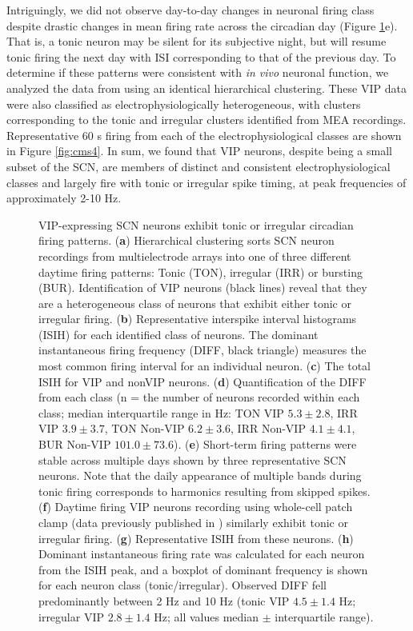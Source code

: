 Intriguingly, we did not observe day-to-day changes in neuronal firing class despite drastic changes in mean firing rate across the circadian day (Figure \ref{fig:cm2}e).
That is, a tonic neuron may be silent for its subjective night, but will resume tonic firing the next day with ISI corresponding to that of the previous day.
To determine if these patterns were consistent with \textit{in vivo} neuronal function, we analyzed the data from \cite{Hermanstyne2016} using an identical hierarchical clustering.
These VIP data were also classified as electrophysiologically heterogeneous, with clusters corresponding to the tonic and irregular clusters identified from MEA recordings.
Representative 60 s firing from each of the electrophysiological classes are shown in Figure \ref{fig:cms4}.
In sum, we found that VIP neurons, despite being a small subset of the SCN, are members of distinct and consistent electrophysiological classes and largely fire with tonic or irregular spike timing, at peak frequencies of approximately 2-10 Hz.
\clearpage
\begin{figure}[!p]
    \caption{\label{fig:cm2} 
    VIP-expressing SCN neurons exhibit tonic or irregular circadian firing patterns.
    (\textbf{a}) Hierarchical clustering sorts SCN neuron recordings from multielectrode arrays into one of three different daytime firing patterns: Tonic (TON), irregular (IRR) or bursting (BUR). Identification of VIP neurons (black lines) reveal that they are a heterogeneous class of neurons that exhibit either tonic or irregular firing. 
    (\textbf{b})  Representative interspike interval histograms (ISIH) for each identified class of neurons. The dominant instantaneous firing frequency (DIFF, black triangle) measures the most common firing interval for an individual neuron. 
    (\textbf{c}) The total ISIH for VIP and nonVIP neurons. 
    (\textbf{d}) Quantification of the DIFF from each class (n = the number of neurons recorded within each class; median interquartile range in Hz: TON VIP $5.3 \pm 2.8$, IRR VIP $3.9 \pm 3.7$, TON Non-VIP $6.2 \pm 3.6$, IRR Non-VIP $4.1 \pm 4.1$, BUR Non-VIP $101.0 \pm 73.6$). 
    (\textbf{e}) Short-term firing patterns were stable across multiple days shown by three representative SCN neurons. Note that the daily appearance of multiple bands during tonic firing corresponds to harmonics resulting from skipped spikes. 
    (\textbf{f}) Daytime firing VIP neurons recording using whole-cell patch clamp (data previously published in \cite{Hermanstyne2016}) similarly exhibit tonic or irregular firing. 
    (\textbf{g}) Representative ISIH from these neurons.
    (\textbf{h}) Dominant instantaneous firing rate was calculated for each neuron from the ISIH peak, and a boxplot of dominant frequency is shown for each neuron class (tonic/irregular). Observed DIFF fell predominantly between 2 Hz and 10 Hz (tonic VIP $4.5 \pm 1.4$ Hz; irregular VIP $2.8 \pm 1.4$ Hz; all values median $\pm$ interquartile range).
    }
\end{figure}

